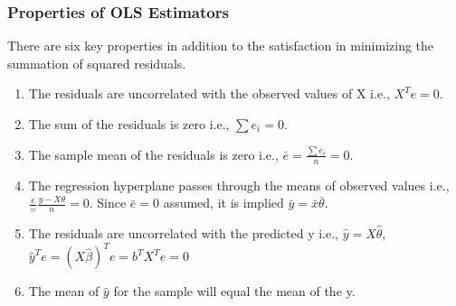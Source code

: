 \documentclass[12pt]{article}
\begin{document}
\subsubsection{Properties of OLS Estimators}
There are six key properties in addition to the satisfaction in minimizing the summation of squared residuals.
\begin{enumerate}
	\item The residuals are uncorrelated with the observed values of X i.e., $X^{T}e=0$.
	\item The sum of the residuals is zero i.e., $\sum e_i=0$.
	\item The sample mean of the residuals is zero i.e., $\bar{e} = \frac{\sum e_i}{n} = 0$.
	\item The regression hyperplane passes through the means of observed values i.e., $\frac{e} = \frac{y - X\theta}{n} = 0$. Since $\bar{e} = 0$ assumed, it is implied $\bar{y}=\bar{x}\bar{\theta}$.
	\item The residuals are uncorrelated with the predicted y i.e., $\hat{y} = X\hat{\theta}$, $\hat{y}^{T}e = (X\hat{\beta})^{T}e = b^{T}X^{T}e = 0$
	\item The mean of $\hat{y}$ for the sample will equal the mean of the y.
\end{enumerate}
\end{document}
